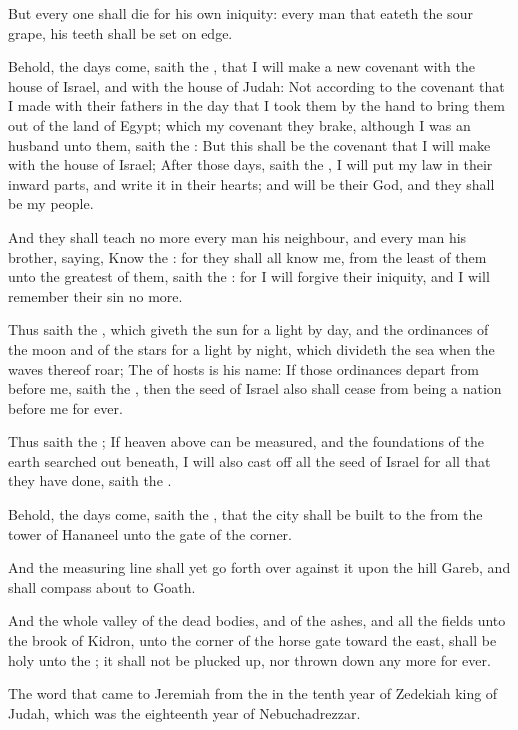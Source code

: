 \Verse But every one shall die for his own iniquity: every man that eateth the sour grape, his teeth shall be set on edge.

\Verse Behold, the days come, saith the \LORD, that I will make a new covenant with the house of Israel, and with the house of Judah: \Verse Not according to the covenant that I made with their fathers in the day that I took them by the hand to bring them out of the land of Egypt; which my covenant they brake, although I was an husband unto them, saith the \LORD: \Verse But this shall be the covenant that I will make with the house of Israel; After those days, saith the \LORD, I will put my law in their inward parts, and write it in their hearts; and will be their God, and they shall be my people.

\Verse And they shall teach no more every man his neighbour, and every man his brother, saying, Know the \LORD: for they shall all know me, from the least of them unto the greatest of them, saith the \LORD: for I will forgive their iniquity, and I will remember their sin no more.

\Verse Thus saith the \LORD, which giveth the sun for a light by day, and the ordinances of the moon and of the stars for a light by night, which divideth the sea when the waves thereof roar; The \LORD of hosts is his name: \Verse If those ordinances depart from before me, saith the \LORD, then the seed of Israel also shall cease from being a nation before me for ever.

\Verse Thus saith the \LORD; If heaven above can be measured, and the foundations of the earth searched out beneath, I will also cast off all the seed of Israel for all that they have done, saith the \LORD.

\Verse Behold, the days come, saith the \LORD, that the city shall be built to the \LORD from the tower of Hananeel unto the gate of the corner.

\Verse And the measuring line shall yet go forth over against it upon the hill Gareb, and shall compass about to Goath.

\Verse And the whole valley of the dead bodies, and of the ashes, and all the fields unto the brook of Kidron, unto the corner of the horse gate toward the east, shall be holy unto the \LORD; it shall not be plucked up, nor thrown down any more for ever.


\Chapter
\Verse The word that came to Jeremiah from the \LORD in the tenth year of Zedekiah king of Judah, which was the eighteenth year of Nebuchadrezzar.

